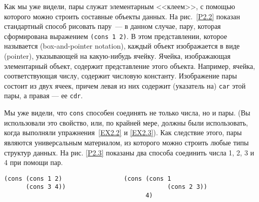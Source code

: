 Как мы уже видели, пары служат элементарным <<клеем>>, с
помощью которого можно строить составные объекты данных. На
рис.~\ref{P2.2} показан стандартный способ рисовать пару~--- 
в данном случае, пару, которая сформирована выражением {\tt (cons 1
2)}.  В этом представлении, которое называется 
(box-and-pointer notation), каждый объект изображается в виде
 (pointer), 
указывающей на какую-нибудь ячейку.  Ячейка, 
изображающая элементарный объект, содержит представление этого
объекта.  Например, ячейка, соответствующая числу, содержит числовую
константу.  Изображение пары состоит из двух ячеек, причем левая
из них содержит (указатель на) {\tt car} этой пары, а правая
--- ее {\tt cdr}.


\begin{cntrfig}

\caption{Представление {\tt (cons 1 2)} в виде стрелочной диаграммы.}
\label{P2.2}

\end{cntrfig}

Мы уже видели, что {\tt cons} способен соединять не
только числа, но и пары. (Вы использовали это свойство, или, по крайней мере,
должны были использовать, когда выполняли упражнения~\ref{EX2.2} и \ref{EX2.3}).  Как следствие
этого, пары являются универсальным материалом, из
которого можно строить любые типы структур данных.  На рис. \ref{P2.3} показаны два способа соединить числа 1, 2, 3
и 4 при помощи пар.


\begin{cntrfig}

\begin{Verbatim}
(cons (cons 1 2)                 (cons (cons 1
      (cons 3 4))                            (cons 2 3))
                                       4)
\end{Verbatim}
\caption{Два способа соединить 1, 2, 3 и 4 с помощью
пар.}
\label{P2.3}

\end{cntrfig}

